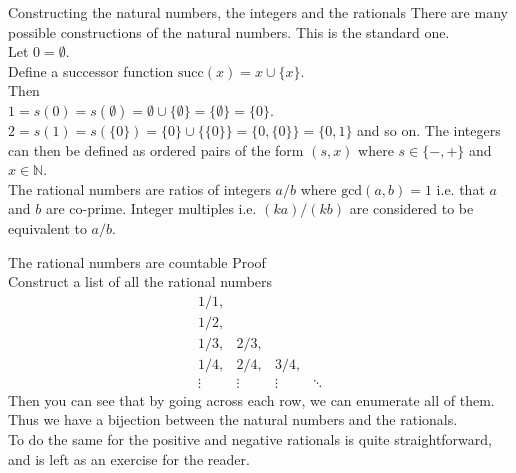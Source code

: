 \documentclass{beamer}
\begin{document}
\begin{frame}{Constructing the natural numbers, the integers and the rationals}
There are many possible constructions of the natural numbers. This is the standard one.\\
Let $0 = \emptyset$. \\
Define a successor function $\text{succ}{(x)} = x \cup \{ x \}$.\\
Then\\
$1 = s(0) = s(\emptyset) = \emptyset \cup \{ \emptyset \} = \{\emptyset\} = \{ 0 \}$.\\
$2 = s(1) = s(\{ 0 \}) = \{ 0 \} \cup \{ \{ 0 \} \} = \{ 0, \{ 0 \} \} = \{0, 1\}$ and so on.
The integers can then be defined as ordered pairs of the form $(s, x)$ where $s \in \{-, +\}$ and
$x \in \mathbb{N}$. \\
The rational numbers are ratios of integers $a / b$ where $\text{gcd}(a, b) = 1$ i.e. that $a$ and $b$ are
co-prime. Integer multiples i.e. $(k a) / (k b)$ are considered to be equivalent to $a / b$.
\end{frame}


\begin{frame}{The rational numbers are countable}
Proof\\
Construct a list of all the rational numbers
\begin{equation*}
\begin{array}{llll}
1/1,\\
1/2,\\
1/3,& 2/3,\\
1/4,& 2/4,& 3/4,\\
\vdots & \vdots & \vdots & \ddots
\end{array}
\end{equation*}
Then you can see that by going across each row, we can enumerate all of them. Thus we have a bijection between the
natural numbers and the rationals.\\
To do the same for the positive and negative rationals is quite straightforward, and is left as an exercise
for the reader.
\end{frame}
\end{document}
